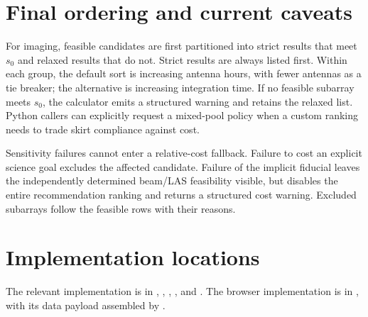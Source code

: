 \documentclass[11pt]{article}
\begin{document}
\section{Final ordering and current caveats}

For imaging, feasible candidates are first partitioned into strict results
that meet $s_0$ and relaxed results that do not.  Strict results are always
listed first.  Within each group, the default sort is increasing antenna
hours, with fewer antennas as a tie breaker; the alternative is increasing
integration time.  If no feasible subarray meets $s_0$, the calculator emits
a structured warning and retains the relaxed list.  Python callers can
explicitly request a mixed-pool policy when a custom ranking needs to trade
skirt compliance against cost.

Sensitivity failures cannot enter a relative-cost fallback.  Failure to cost
an explicit science goal excludes the affected candidate.  Failure of the
implicit fiducial leaves the independently determined beam/LAS feasibility
visible, but disables the entire recommendation ranking and returns a
structured cost warning.  Excluded subarrays follow the feasible rows with
their reasons.

\section*{Implementation locations}

The relevant implementation is in ,
, ,
, and .  The
browser implementation is in , with its
data payload assembled by .
\end{document}
